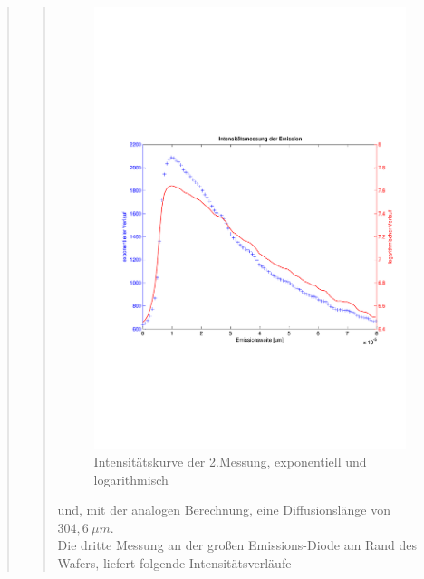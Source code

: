 \begin{quote}
\begin{quote}
        \begin{figure}[H]
                    \centering
                        \includegraphics[scale=0.53, trim = 1cm 6cm 1.5cm 8cm,
                        clip]{./Emissionsbilder/zwei/Intensitatsmessung.pdf}
                        \caption{Intensitätskurve der 2.Messung, exponentiell
                        und logarithmisch}
                            \label{fig:./Emissionsbilder/zwei/Intensitatsmessung.pdf}
        \end{figure}
        
        und, mit der analogen Berechnung, eine Diffusionslänge von $304,6\ \mu
        m$.\\
        
        Die dritte Messung an der großen Emissions-Diode am Rand des Wafers,
        liefert folgende Intensitätsverläufe
        

\end{quote}
\end{quote}
